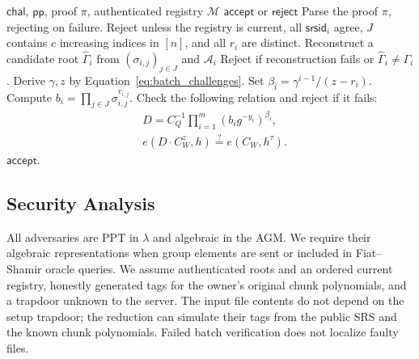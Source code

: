 \documentclass[lettersize,journal]{IEEEtran}
\newcommand{\Verify}{\ensuremath{\mathsf{Verify}}}
\begin{document}
\begin{algorithm}[h]
\caption{\textbf{$\Verify$}}
\label{alg:verify}
\begin{algorithmic}[1]
\Require $\mathsf{chal}$, $\mathsf{pp}$, proof $\pi$, authenticated registry $\mathcal M$
\Ensure $\mathsf{accept}$ or $\mathsf{reject}$
\State Parse the proof $\pi$, rejecting on failure.
\State Reject unless the registry is current, all $\mathsf{srsid}_i$ agree, $J$ contains $c$ increasing indices in $[n]$, and all $r_i$ are distinct.
\State Reconstruct a candidate root $\widehat\Gamma_i$ from $(\sigma_{i,j})_{j\in J}$ and $\mathcal A_i$
\State Reject if reconstruction fails or $\widehat\Gamma_i\ne\Gamma_i$.
\EndFor
\State Derive $\gamma,z$ by Equation~\eqref{eq:batch_challenges}.
\State Set $\beta_i=\gamma^{i-1}/(z-r_i)$.
\State Compute $b_i=\prod_{j\in J}\sigma_{i,j}^{v_{i,j}}$.
\EndFor
\State Check the following relation and reject if it fails:
\Statex
\begin{equation}\label{eq:batch_pairing}
\begin{aligned}
&D=C_Q^{-1}\prod_{i=1}^m(b_i g^{-y_i})^{\beta_i},\\
&e(D\cdot C_W^z,h)\stackrel{?}{=}e(C_W,h^\tau).
\end{aligned}
\end{equation}
\State \Return $\mathsf{accept}$.
\end{algorithmic}
\end{algorithm}
\subsection{Security Analysis}
All adversaries are PPT in $\lambda$ and algebraic in the AGM. We require their algebraic representations when group elements are sent or included in Fiat--Shamir oracle queries. We assume authenticated roots and an ordered current registry, honestly generated tags for the owner's original chunk polynomials, and a trapdoor unknown to the server. The input file contents do not depend on the setup trapdoor; the reduction can simulate their tags from the public SRS and the known chunk polynomials. Failed batch verification does not localize faulty files.
\end{document}

